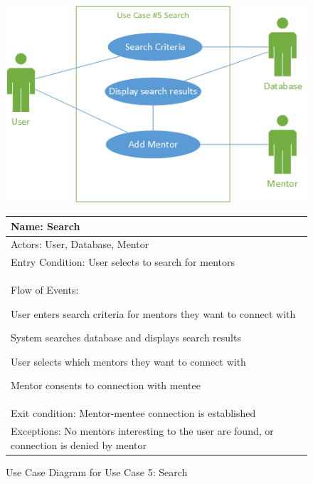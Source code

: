 \documentclass[11pt]{article}
\begin{document}
            \begin{figure}[H]
            \centering
            \includegraphics{UseCase5Search}

				\begin{tabular}{|p{12 cm}|}
					\hline
					Name: Search \\ \hline
					Actors: User, Database, Mentor \\ \hline
					Entry Condition: User selects to search for mentors
					\\ \hline
					Flow of Events:
					\begin{enumerate*}
						\item User enters search criteria for mentors they want
						to connect with
						\item System searches database and displays search
						results
						\item User selects which mentors they want to connect
						with
						\item Mentor consents to connection with mentee
					\end{enumerate*} \\ \hline
					Exit condition: Mentor-mentee connection is established
					\\ \hline
					Exceptions: No mentors interesting to the user are found, or
					connection is denied by mentor \\ \hline
				\end{tabular}

            \caption{Use Case Diagram for Use Case 5: Search}
            \label{UC5}
            \end{figure}
\end{document}
